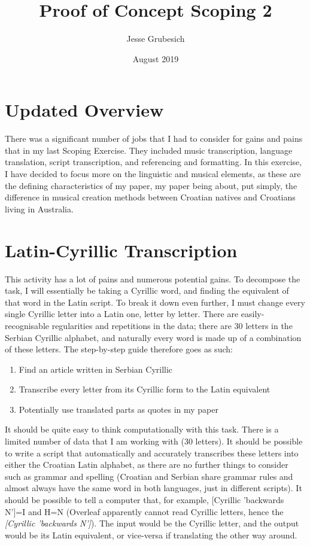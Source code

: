 \documentclass{article}
\title{Proof of Concept Scoping 2}
\author{Jesse Grubesich}
\date{August 2019}
\begin{document}
\maketitle

\section{Updated Overview}
There was a significant number of jobs that I had to consider for gains and pains that in my last Scoping Exercise. They included music transcription, language translation, script transcription, and referencing and formatting. In this exercise, I have decided to focus more on the linguistic and musical elements, as these are the defining characteristics of my paper, my paper being about, put simply, the difference in musical creation methods between Croatian natives and Croatians living in Australia.

\section{Latin-Cyrillic Transcription}
This activity has a lot of pains and numerous potential gains. To decompose the task, I will essentially be taking a Cyrillic word, and finding the equivalent of that word in the Latin script. To break it down even further, I must change every single Cyrillic letter into a Latin one, letter by letter. There are easily-recognisable regularities and repetitions in the data; there are 30 letters in the Serbian Cyrillic alphabet, and naturally every word is made up of a combination of these letters. The step-by-step guide therefore goes as such:
\begin{enumerate}
\item Find an article written in Serbian Cyrillic
\item Transcribe every letter from its Cyrillic form to the Latin equivalent
\item Potentially use translated parts as quotes in my paper
\end{enumerate}
It should be quite easy to think computationally with this task. There is a limited number of data that I am working with (30 letters). It should be possible to write a script that automatically and accurately transcribes these letters into either the Croatian Latin alphabet, as there are no further things to consider such as grammar and spelling (Croatian and Serbian share grammar rules and almost always have the same word in both languages, just in different scripts). It should be possible to tell a computer that, for example, [Cyrillic 'backwards N']=I and H=N (Overleaf apparently cannot read Cyrillic letters, hence the \textit{[Cyrillic 'backwards N']}). The input would be the Cyrillic letter, and the output would be its Latin equivalent, or vice-versa if translating the other way around.
\end{document}
